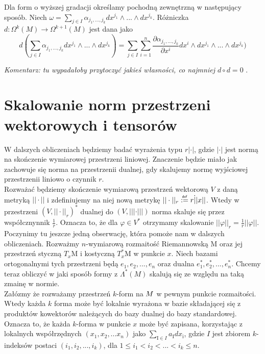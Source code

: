 \documentclass[licencjacka]{pracamgr}
\theoremstyle{definition}
\theoremstyle{definition}
\theoremstyle{plain}
\theoremstyle{plain}
\theoremstyle{plain}
\def\M{\ensuremath M}
\newcommand\deff{\mathrel{\overset{\makebox[0pt]{\mbox{\normalfont\tiny\sffamily def}}}{:=}}}
\begin{document}
Dla form o wyższej gradacji określamy pochodną zewnętrzną w następujący
sposób. Niech 
$\omega = \sum_{j \in I} \alpha_{j_1, ..., j_k} dx^{j_1} \wedge ... \wedge dx^{j_k}$.
Różniczka $d: \Omega^k(M) \rightarrow \Omega^{k+1}(M)$ jest dana jako
\[ %
d( \sum_{j \in I} \alpha_{j_1, ..., j_k} dx^{j_1} \wedge ... \wedge dx^{j_k}) = 
 \sum_{j \in I} \sum_{i=1}^n
 \frac{ \partial \alpha_{j_1, ..., j_k}} {\partial x^i} dx^i
                            \wedge dx^{j_1} \wedge ... \wedge dx^{j_k})
\]

\emph{Komentarz: tu wypadałoby przytoczyć jakieś własności, co najmniej $d \circ d = 0$ }. \\


\section{Skalowanie norm przestrzeni wektorowych i tensorów}
W dalszych obliczeniach będziemy badać wyrażenia typu $r |\cdot|$, gdzie
$|\cdot|$ jest normą na skończenie wymiarowej przestrzeni liniowej.
Znaczenie będzie miało jak zachowuje się norma na przestrzenii dualnej,
gdy skalujemy normę wyjściowej przestrzenii liniowo o czynnik $r$. \\


Rozważać będziemy skończenie wymiarową przestrzeń wektorową $V$ z daną
metryką $|| \cdot ||$ i zdefiniujemy na niej nową metrykę $|| \cdot
||_r \deff r \dot || x ||$. Wtedy w przestrzeni $(V, ||
\cdot||_r)^\ast$ dualnej do $(V, ||| \cdot |||)$ norma skaluje się
przez współcznynnik $\frac{1}{r}$. Oznacza to, że dla $\varphi \in
V^\ast$ otrzymamy skalowanie $||\varphi||_r = \frac{1}{r} ||\varphi||$. \\

Poczynimy tu jeszcze jedną obserwację, która pomoże nam w dalszych
obliczeniach.  Rozważmy $n$-wymiarową rozmaitość Riemannowską
$\mathrm{M}$ oraz jej przestrzeń styczną $T_x\mathrm{M}$ i kostyczną
$T_x^\ast\mathrm{M}$ w punkcie $x$.  Niech bazami ortogonalnymi tych
przestrzeni będą $e_1, e_2, ..., e_n$ oraz dualna $e_1^\ast, e_2^\ast,
..., e_n^\ast$.  Chcemy teraz obliczyć w jaki sposób formy z
$\Lambda^\ast(M)$ skalują się ze względu na taką zmainę w
normie. \\

Załózmy że rozważamy przestrzeń $k$-form na $\M$ w pewnym
punkcie rozmaitości. Wtedy każda $k$ forma może być lokalnie wyrażona
w bazie składającej się z produktów kowektorów należących do bazy
dualnej do bazy standardowej. Oznacza to, że każda $k$-forma w punkcie
$x$ może być zapisana, korzystając z lokalnych współrzędnych $(x_1,
x_2, ... x_n)$ jako $ \sum_{\mathrm{I} \in I } a_\mathrm{I}
dx_\mathrm{i}$, gdzie $I$ jest zbiorem $k$-indeksów postaci
$(i_1, i_2, ..., i_k)$, dla $ 1 \leq i_1 < i_2 < ... < i_k \leq n$.  \\
\end{document}
